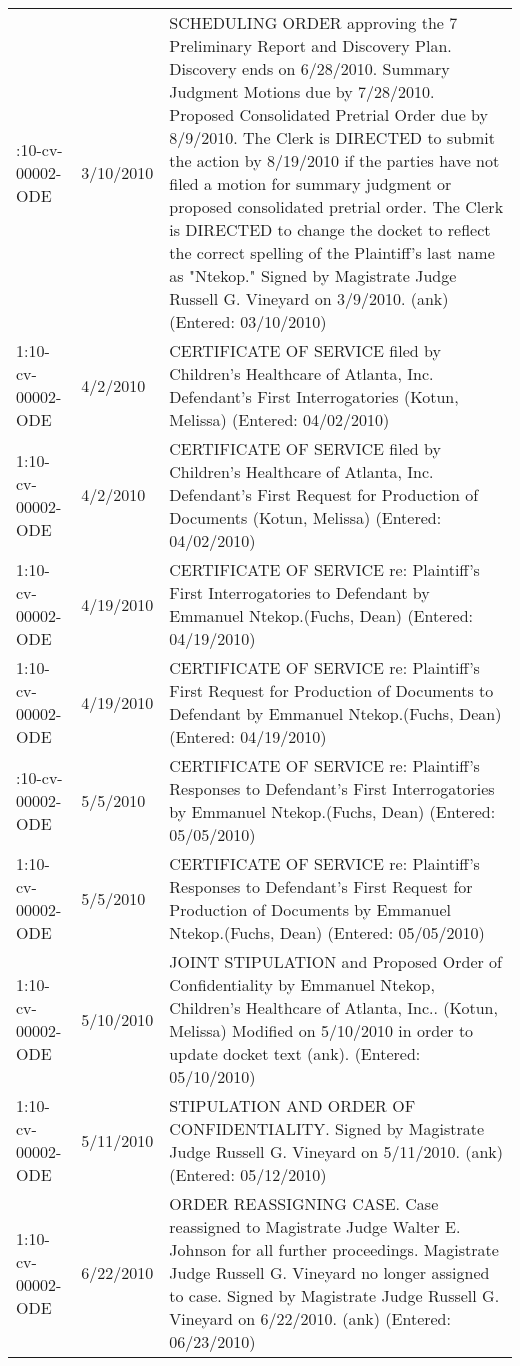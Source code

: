 \begin{longtable}{ll>{\raggedright\arraybackslash}p{30em}}
\addlinespace
1:10-cv-00002-ODE & 3/10/2010 & SCHEDULING ORDER approving the 7 Preliminary Report and Discovery Plan. Discovery ends on 6/28/2010. Summary Judgment Motions due by 7/28/2010. Proposed Consolidated Pretrial Order due by 8/9/2010. The Clerk is DIRECTED to submit the action by 8/19/2010 if the parties have not filed a motion for summary judgment or proposed consolidated pretrial order. The Clerk is DIRECTED to change the docket to reflect the correct spelling of the Plaintiff's last name as "Ntekop." Signed by Magistrate Judge Russell G. Vineyard on 3/9/2010. (ank) (Entered: 03/10/2010)\\
1:10-cv-00002-ODE & 4/2/2010 & CERTIFICATE OF SERVICE filed by Children's Healthcare of Atlanta, Inc. Defendant's First Interrogatories (Kotun, Melissa) (Entered: 04/02/2010)\\
1:10-cv-00002-ODE & 4/2/2010 & CERTIFICATE OF SERVICE filed by Children's Healthcare of Atlanta, Inc. Defendant's First Request for Production of Documents (Kotun, Melissa) (Entered: 04/02/2010)\\
1:10-cv-00002-ODE & 4/19/2010 & CERTIFICATE OF SERVICE re: Plaintiff's First Interrogatories to Defendant by Emmanuel Ntekop.(Fuchs, Dean) (Entered: 04/19/2010)\\
1:10-cv-00002-ODE & 4/19/2010 & CERTIFICATE OF SERVICE re: Plaintiff's First Request for Production of Documents to Defendant by Emmanuel Ntekop.(Fuchs, Dean) (Entered: 04/19/2010)\\
\addlinespace
1:10-cv-00002-ODE & 5/5/2010 & CERTIFICATE OF SERVICE re: Plaintiff's Responses to Defendant's First Interrogatories by Emmanuel Ntekop.(Fuchs, Dean) (Entered: 05/05/2010)\\
1:10-cv-00002-ODE & 5/5/2010 & CERTIFICATE OF SERVICE re: Plaintiff's Responses to Defendant's First Request for Production of Documents by Emmanuel Ntekop.(Fuchs, Dean) (Entered: 05/05/2010)\\
1:10-cv-00002-ODE & 5/10/2010 & JOINT STIPULATION and Proposed Order of Confidentiality by Emmanuel Ntekop, Children's Healthcare of Atlanta, Inc.. (Kotun, Melissa) Modified on 5/10/2010 in order to update docket text (ank). (Entered: 05/10/2010)\\
1:10-cv-00002-ODE & 5/11/2010 & STIPULATION AND ORDER OF CONFIDENTIALITY. Signed by Magistrate Judge Russell G. Vineyard on 5/11/2010. (ank) (Entered: 05/12/2010)\\
1:10-cv-00002-ODE & 6/22/2010 & ORDER REASSIGNING CASE. Case reassigned to Magistrate Judge Walter E. Johnson for all further proceedings. Magistrate Judge Russell G. Vineyard no longer assigned to case. Signed by Magistrate Judge Russell G. Vineyard on 6/22/2010. (ank) (Entered: 06/23/2010)\\

\end{longtable}

